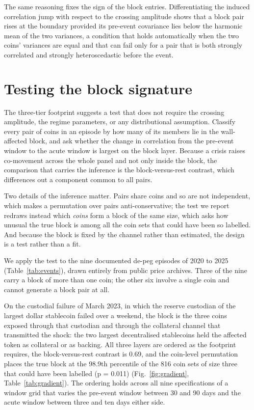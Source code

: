The same reasoning fixes the sign of the block entries. Differentiating the induced correlation jump with respect to the crossing amplitude shows that a block pair rises at the boundary provided its pre-event covariance lies below the harmonic mean of the two variances, a condition that holds automatically when the two coins' variances are equal and that can fail only for a pair that is both strongly correlated and strongly heteroscedastic before the event.

\section*{Testing the block signature}

The three-tier footprint suggests a test that does not require the crossing amplitude, the regime parameters, or any distributional assumption. Classify every pair of coins in an episode by how many of its members lie in the wall-affected block, and ask whether the change in correlation from the pre-event window to the acute window is largest on the block layer. Because a crisis raises co-movement across the whole panel and not only inside the block, the comparison that carries the inference is the block-versus-rest contrast, which differences out a component common to all pairs.

Two details of the inference matter. Pairs share coins and so are not independent, which makes a permutation over pairs anti-conservative; the test we report redraws instead which \emph{coins} form a block of the same size, which asks how unusual the true block is among all the coin sets that could have been so labelled. And because the block is fixed by the channel rather than estimated, the design is a test rather than a fit.

We apply the test to the nine documented de-peg episodes of 2020 to 2025 (Table~\ref{tab:events}), drawn entirely from public price archives. Three of the nine carry a block of more than one coin; the other six involve a single coin and cannot generate a block pair at all.

On the custodial failure of March 2023, in which the reserve custodian of the largest dollar stablecoin failed over a weekend, the block is the three coins exposed through that custodian and through the collateral channel that transmitted the shock: the two largest decentralised stablecoins held the affected token as collateral or as backing. All three layers are ordered as the footprint requires, the block-versus-rest contrast is 0.69, and the coin-level permutation places the true block at the 98.9th percentile of the 816 coin sets of size three that could have been labelled (p = 0.011) (Fig.~\ref{fig:gradient}, Table~\ref{tab:gradient}). The ordering holds across all nine specifications of a window grid that varies the pre-event window between 30 and 90 days and the acute window between three and ten days either side.

